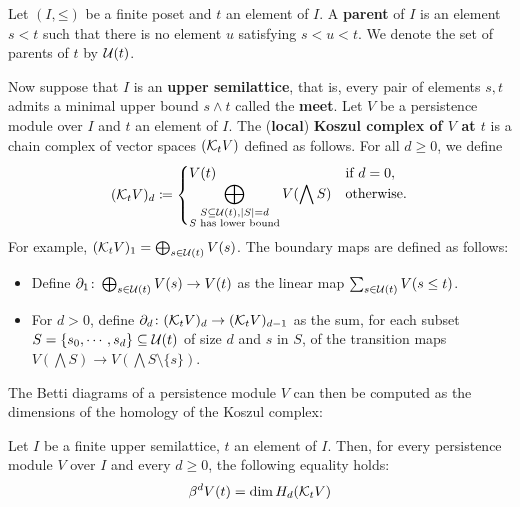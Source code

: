 \begin{definition}
  Let $(I, \mathord{\leq})$ be a finite poset and $t$ an element of $I$. A \textbf{parent} of $I$ is an element $s < t$ such that there is no element $u$ satisfying $s < u < t$. We denote the set of parents of $t$ by $\mathcal{U}(t)$.
  
  Now suppose that $I$ is an \textbf{upper semilattice}, that is, every pair of elements $s, t$ admits a minimal upper bound $s \wedge t$ called the \textbf{meet}. Let $V$ be a persistence module over $I$ and $t$ an element of $I$. The (\textbf{local}) \textbf{Koszul complex of $V$ at $t$} is a chain complex of vector spaces $(\mathcal{K}_t V)$ defined as follows. For all $d \geq 0$, we define
  \[
    (\mathcal{K}_t V)_d \coloneq \begin{cases}
      V(t) & \text{if } d = 0, \\
      \displaystyle \bigoplus_{\substack{S \subseteq \mathcal{U}(t), |S| = d \\ S \text{ has lower bound}}} V(\bigwedge S) & \text{otherwise}.
    \end{cases}
  \]
  For example, $(\mathcal{K}_t V)_1 = \bigoplus_{s \in \mathcal{U}(t)} V(s)$. The boundary maps are defined as follows:
  \begin{itemize}
    \item Define $\partial_1 \colon \bigoplus_{s \in \mathcal{U}(t)} V(s) \to V(t)$ as the linear map $\sum_{s \in \mathcal{U}(t)} V(s \leq t)$.
    \item For $d > 0$, define $\partial_d \colon (\mathcal{K}_t V)_d \to (\mathcal{K}_t V)_{d - 1}$ as the sum, for each subset $S = \{s_0, \cdots, s_d\} \subseteq \mathcal{U}(t)$ of size $d$ and $s$ in $S$, of the transition maps $V(\bigwedge S) \to V(\bigwedge S \setminus \{s\})$. \qedhere
  \end{itemize}
\end{definition}

The Betti diagrams of a persistence module $V$ can then be computed as the dimensions of the homology of the Koszul complex:

\begin{theorem}
\label{!T:Koszul-computes-Betti}
  Let $I$ be a finite upper semilattice, $t$ an element of $I$. Then, for every persistence module $V$ over $I$ and every $d \geq 0$, the following equality holds:
  \[
    \beta^d V(t) = \dim H_d(\mathcal{K}_t V)
  \]
\end{theorem}

